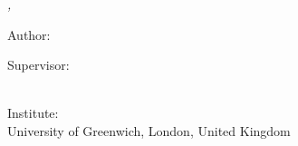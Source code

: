 \hfill
\vfill

\noindent \textit{\myTitle,} {\textcopyright} {\mySubmissionMonth} {\mySubmissionYear}

\bigskip

\noindent Author:\\
{\myFirstName} \textsc{\myLastName}

\medskip

\noindent Supervisor:\\
{\myProfTitle} {\myProfFirstName} \textsc{\myProfLastName}\\

\medskip

\noindent Institute:\\
University of Greenwich, London, United Kingdom
